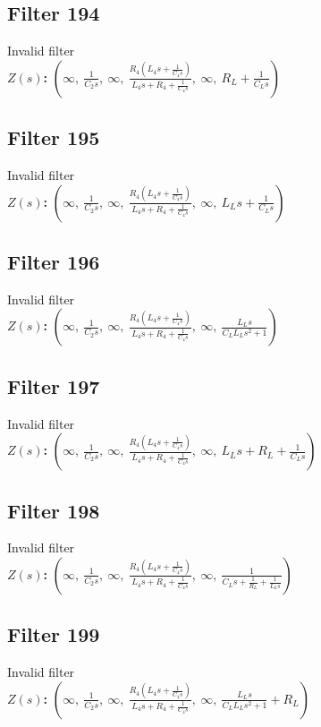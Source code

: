 \documentclass{article}
\begin{document}
\subsection*{Filter 194}
Invalid filter \\ 
\textbf{$Z(s)$:} $\left( \infty, \  \frac{1}{C_{2} s}, \  \infty, \  \frac{R_{4} \left(L_{4} s + \frac{1}{C_{4} s}\right)}{L_{4} s + R_{4} + \frac{1}{C_{4} s}}, \  \infty, \  R_{L} + \frac{1}{C_{L} s}\right)$ \\ 
\subsection*{Filter 195}
Invalid filter \\ 
\textbf{$Z(s)$:} $\left( \infty, \  \frac{1}{C_{2} s}, \  \infty, \  \frac{R_{4} \left(L_{4} s + \frac{1}{C_{4} s}\right)}{L_{4} s + R_{4} + \frac{1}{C_{4} s}}, \  \infty, \  L_{L} s + \frac{1}{C_{L} s}\right)$ \\ 
\subsection*{Filter 196}
Invalid filter \\ 
\textbf{$Z(s)$:} $\left( \infty, \  \frac{1}{C_{2} s}, \  \infty, \  \frac{R_{4} \left(L_{4} s + \frac{1}{C_{4} s}\right)}{L_{4} s + R_{4} + \frac{1}{C_{4} s}}, \  \infty, \  \frac{L_{L} s}{C_{L} L_{L} s^{2} + 1}\right)$ \\ 
\subsection*{Filter 197}
Invalid filter \\ 
\textbf{$Z(s)$:} $\left( \infty, \  \frac{1}{C_{2} s}, \  \infty, \  \frac{R_{4} \left(L_{4} s + \frac{1}{C_{4} s}\right)}{L_{4} s + R_{4} + \frac{1}{C_{4} s}}, \  \infty, \  L_{L} s + R_{L} + \frac{1}{C_{L} s}\right)$ \\ 
\subsection*{Filter 198}
Invalid filter \\ 
\textbf{$Z(s)$:} $\left( \infty, \  \frac{1}{C_{2} s}, \  \infty, \  \frac{R_{4} \left(L_{4} s + \frac{1}{C_{4} s}\right)}{L_{4} s + R_{4} + \frac{1}{C_{4} s}}, \  \infty, \  \frac{1}{C_{L} s + \frac{1}{R_{L}} + \frac{1}{L_{L} s}}\right)$ \\ 
\subsection*{Filter 199}
Invalid filter \\ 
\textbf{$Z(s)$:} $\left( \infty, \  \frac{1}{C_{2} s}, \  \infty, \  \frac{R_{4} \left(L_{4} s + \frac{1}{C_{4} s}\right)}{L_{4} s + R_{4} + \frac{1}{C_{4} s}}, \  \infty, \  \frac{L_{L} s}{C_{L} L_{L} s^{2} + 1} + R_{L}\right)$ \\ 
\end{document}

